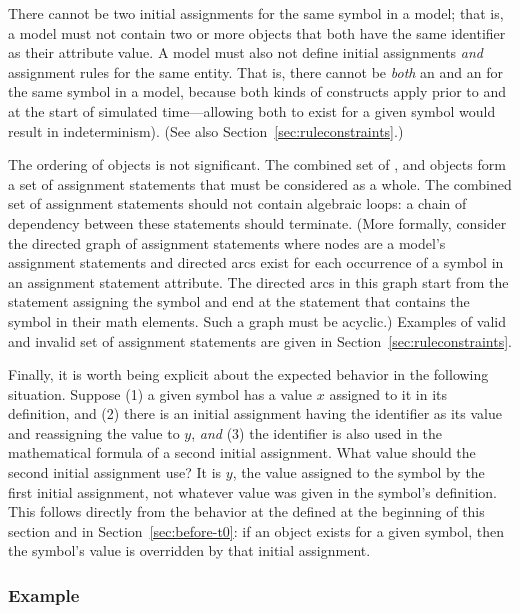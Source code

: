 There cannot be two initial assignments for the same symbol in a
model; that is, a model must not contain two or more
\InitialAssignment objects that both have the same identifier as
their  attribute value.  A model must also not define
initial assignments \emph{and} assignment rules for the same
entity.  That is, there cannot be \emph{both} an
\InitialAssignment and an \AssignmentRule for the same symbol in a
model, because both kinds of constructs apply prior to and at the
start of simulated time---allowing both to exist for a given
symbol would result in indeterminism).  (See also
Section~\ref{sec:ruleconstraints}.)

The ordering of \InitialAssignment objects is not significant.
The combined set of \InitialAssignment, \AssignmentRule and
\KineticLaw objects form a set of assignment statements that must
be considered as a whole.  The combined set of assignment
statements should not contain algebraic loops: a chain of
dependency between these statements should terminate.  (More
formally, consider the directed graph of assignment statements
where nodes are a model's assignment statements and directed arcs
exist for each occurrence of a symbol in an assignment statement
 attribute.  The directed arcs in this graph start from
the statement assigning the symbol and end at the statement that
contains the symbol in their math elements.  Such a graph must be
acyclic.) Examples of valid and invalid set of assignment
statements are given in Section~\ref{sec:ruleconstraints}.

Finally, it is worth being explicit about the expected behavior in
the following situation.  Suppose (1) a given symbol has a value
$x$ assigned to it in its definition, and (2) there is an initial
assignment having the identifier as its  value and
reassigning the value to $y$, \emph{and} (3) the identifier is
also used in the mathematical formula of a second initial
assignment.  What value should the second initial assignment use?
It is $y$, the value assigned to the symbol by the first initial
assignment, not whatever value was given in the symbol's
definition.  This follows directly from the behavior at the
defined at the beginning of this section and in
Section~\ref{sec:before-t0}: if an \InitialAssignment object
exists for a given symbol, then the symbol's value is overridden
by that initial assignment.


\subsubsection{Example}


